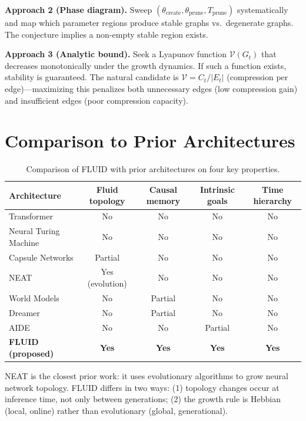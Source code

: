 \documentclass[12pt]{article}
\begin{document}
\textbf{Approach 2 (Phase diagram).} Sweep $(\theta_{\text{create}}, \theta_{\text{prune}}, T_{\text{prune}})$ systematically and map which parameter regions produce stable graphs vs.\ degenerate graphs. The conjecture implies a non-empty stable region exists.

\textbf{Approach 3 (Analytic bound).} Seek a Lyapunov function $\mathcal{V}(G_t)$ that decreases monotonically under the growth dynamics. If such a function exists, stability is guaranteed. The natural candidate is $\mathcal{V} = C_t / |E_t|$ (compression per edge)---maximizing this penalizes both unnecessary edges (low compression gain) and insufficient edges (poor compression capacity).

\section{Comparison to Prior Architectures}

\begin{table}[H]
\centering
\small
\begin{tabular}{lcccc}
\toprule
\textbf{Architecture} & \textbf{Fluid topology} & \textbf{Causal memory} & \textbf{Intrinsic goals} & \textbf{Time hierarchy} \\
\midrule
Transformer \cite{vaswani2017} & No & No & No & No \\
Neural Turing Machine \cite{graves2014} & No & No & No & No \\
Capsule Networks \cite{sabour2017} & Partial & No & No & No \\
NEAT \cite{stanley2002} & Yes (evolution) & No & No & No \\
World Models \cite{ha2018} & No & Partial & No & No \\
Dreamer \cite{hafner2020} & No & Partial & No & No \\
AIDE \cite{lu2024} & No & No & Partial & No \\
\textbf{FLUID (proposed)} & \textbf{Yes} & \textbf{Yes} & \textbf{Yes} & \textbf{Yes} \\
\bottomrule
\end{tabular}
\caption{Comparison of FLUID with prior architectures on four key properties.}
\label{tab:comparison}
\end{table}

NEAT \cite{stanley2002} is the closest prior work: it uses evolutionary algorithms to grow neural network topology. FLUID differs in two ways: (1) topology changes occur at inference time, not only between generations; (2) the growth rule is Hebbian (local, online) rather than evolutionary (global, generational).
\end{document}
